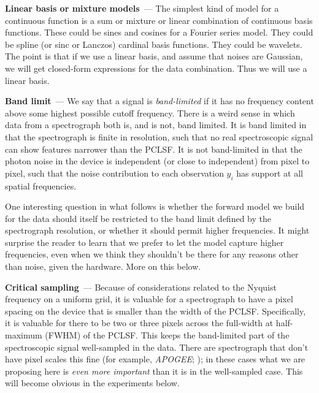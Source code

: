 \documentclass[modern]{aastex631}
\renewcommand{\paragraph}[1]{\medskip\par\noindent\textbf{#1}~---}
\begin{document}
\paragraph{Linear basis or mixture models}
The simplest kind of model for a continuous function is a sum or mixture or linear combination of continuous basis functions.
These could be sines and cosines for a Fourier series model.
They could be spline (or sinc or Lanczos) cardinal basis functions.
They could be wavelets.
The point is that if we use a linear basis, and assume that noises are Gaussian, we will get closed-form expressions for the data combination.
Thus we will use a linear basis.

\paragraph{Band limit}
We say that a signal is \emph{band-limited} if it has no frequency content above some highest possible cutoff frequency.
There is a weird sense in which data from a spectrograph both is, and is not, band limited.
It is band limited in that the spectrograph is finite in resolution, such that no real spectroscopic signal can show features narrower than the PCLSF.
It is not band-limited in that the photon noise in the device is independent (or close to independent) from pixel to pixel, such that the noise contribution to each observation $y_i$ has support at all spatial frequencies.

One interesting question in what follows is whether the forward model we build for the data should itself be restricted to the band limit defined by the spectrograph resolution, or whether it should permit higher frequencies.
It might surprise the reader to learn that we prefer to let the model capture higher frequencies, even when we think they shouldn't be there for any reasons other than noise, given the hardware.
More on this below.

\paragraph{Critical sampling}
Because of considerations related to the Nyquist frequency on a uniform grid, it is valuable for a spectrograph to have a pixel spacing on the device that is smaller than the width of the PCLSF.
Specifically, it is valuable for there to be two or three pixels across the full-width at half-maximum (FWHM) of the PCLSF.
This keeps the band-limited part of the spectroscopic signal well-sampled in the data.
There are spectrograph that don't have pixel scales this fine (for example, \textsl{APOGEE}; \citealt{apogee}); in these cases what we are proposing here is \emph{even more important} than it is in the well-sampled case.
This will become obvious in the experiments below.
\end{document}
